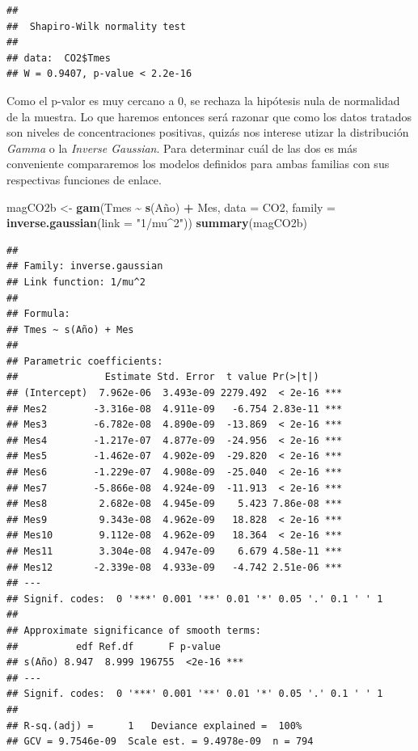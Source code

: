 \documentclass[12pt,a4paper,]{book}
\newenvironment{Shaded}{\begin{snugshade}}{\end{snugshade}}
\newcommand{\AttributeTok}[1]{\textcolor[rgb]{0.13,0.29,0.53}{#1}}
\newcommand{\FunctionTok}[1]{\textcolor[rgb]{0.13,0.29,0.53}{\textbf{#1}}}
\newcommand{\NormalTok}[1]{#1}
\newcommand{\OtherTok}[1]{\textcolor[rgb]{0.56,0.35,0.01}{#1}}
\newcommand{\SpecialCharTok}[1]{\textcolor[rgb]{0.81,0.36,0.00}{\textbf{#1}}}
\newcommand{\StringTok}[1]{\textcolor[rgb]{0.31,0.60,0.02}{#1}}
\numberwithin{dummy}{section}
\theoremstyle{ocrenumbox}
\theoremstyle{blacknumex}
\theoremstyle{blacknumbox}
\theoremstyle{ocrenum}
\theoremstyle{ocrenum}
\begin{document}
\begin{Shaded}
\end{Shaded}

\begin{verbatim}
## 
##  Shapiro-Wilk normality test
## 
## data:  CO2$Tmes
## W = 0.9407, p-value < 2.2e-16
\end{verbatim}

Como el p-valor es muy cercano a 0, se rechaza la hipótesis nula de
normalidad de la muestra. Lo que haremos entonces será razonar que como
los datos tratados son niveles de concentraciones positivas, quizás nos
interese utizar la distribución \emph{Gamma} o la \emph{Inverse
Gaussian}. Para determinar cuál de las dos es más conveniente
compararemos los modelos definidos para ambas familias con sus
respectivas funciones de enlace.

\begin{Shaded}
\begin{Highlighting}[]
\NormalTok{magCO2b }\OtherTok{\textless{}{-}} \FunctionTok{gam}\NormalTok{(Tmes }\SpecialCharTok{\textasciitilde{}} \FunctionTok{s}\NormalTok{(Año) }\SpecialCharTok{+}\NormalTok{ Mes, }\AttributeTok{data =}\NormalTok{ CO2, }
               \AttributeTok{family =} \FunctionTok{inverse.gaussian}\NormalTok{(}\AttributeTok{link =} \StringTok{"1/mu\^{}2"}\NormalTok{))}
\FunctionTok{summary}\NormalTok{(magCO2b)}
\end{Highlighting}
\end{Shaded}

\begin{verbatim}
## 
## Family: inverse.gaussian 
## Link function: 1/mu^2 
## 
## Formula:
## Tmes ~ s(Año) + Mes
## 
## Parametric coefficients:
##               Estimate Std. Error  t value Pr(>|t|)    
## (Intercept)  7.962e-06  3.493e-09 2279.492  < 2e-16 ***
## Mes2        -3.316e-08  4.911e-09   -6.754 2.83e-11 ***
## Mes3        -6.782e-08  4.890e-09  -13.869  < 2e-16 ***
## Mes4        -1.217e-07  4.877e-09  -24.956  < 2e-16 ***
## Mes5        -1.462e-07  4.902e-09  -29.820  < 2e-16 ***
## Mes6        -1.229e-07  4.908e-09  -25.040  < 2e-16 ***
## Mes7        -5.866e-08  4.924e-09  -11.913  < 2e-16 ***
## Mes8         2.682e-08  4.945e-09    5.423 7.86e-08 ***
## Mes9         9.343e-08  4.962e-09   18.828  < 2e-16 ***
## Mes10        9.112e-08  4.962e-09   18.364  < 2e-16 ***
## Mes11        3.304e-08  4.947e-09    6.679 4.58e-11 ***
## Mes12       -2.339e-08  4.933e-09   -4.742 2.51e-06 ***
## ---
## Signif. codes:  0 '***' 0.001 '**' 0.01 '*' 0.05 '.' 0.1 ' ' 1
## 
## Approximate significance of smooth terms:
##          edf Ref.df      F p-value    
## s(Año) 8.947  8.999 196755  <2e-16 ***
## ---
## Signif. codes:  0 '***' 0.001 '**' 0.01 '*' 0.05 '.' 0.1 ' ' 1
## 
## R-sq.(adj) =      1   Deviance explained =  100%
## GCV = 9.7546e-09  Scale est. = 9.4978e-09  n = 794
\end{verbatim}
\end{document}
